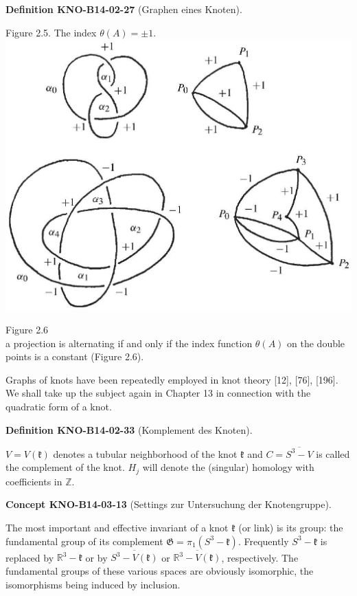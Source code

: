 \documentclass[10pt, letterpaper]{article}
\newcommand{\CustomHeading}[3]{%
  \par\medskip\noindent%
  \textbf{#1 #2} \textnormal{(#3)}.\enskip%
}
\newenvironment{DEF}[2]{\CustomHeading{Definition}{#1}{#2}}{}
\newenvironment{CONC}[2]{\CustomHeading{Concept}{#1}{#2}}{}
\begin{document}
\begin{DEF}{KNO-B14-02-27}{Graphen eines Knoten}
Figure 2.5. The index $\theta(A)= \pm 1$.\\
\includegraphics[scale=0.2, center]{2025_05_21_9c06be8de7a55410f8c1g-033}

Figure 2.6\\
a projection is alternating if and only if the index function $\theta(A)$ on the double points is a constant (Figure 2.6).

Graphs of knots have been repeatedly employed in knot theory [12], [76], [196]. We shall take up the subject again in Chapter 13 in connection with the quadratic form of a knot.
\end{DEF}

\begin{DEF}{KNO-B14-02-33}{Komplement des Knoten}
$V=V(\mathfrak{k})$ denotes a tubular neighborhood of the knot $\mathfrak{k}$ and $C=\overline{S^{3}-V}$ is called the complement of the knot. $H_{j}$ will denote the (singular) homology with coefficients in $\mathbb{Z}$.
\end{DEF}

\begin{CONC}{KNO-B14-03-13}{Settings zur Untersuchung der Knotengruppe}
The most important and effective invariant of a knot $\mathfrak{k}$ (or link) is its group: the fundamental group of its complement $\mathfrak{G}=\pi_{1}\left(S^{3}-\mathfrak{k}\right)$. Frequently $S^{3}-\mathfrak{k}$ is replaced by $\mathbb{R}^{3}-\mathfrak{k}$ or by $\overline{S^{3}-V(\mathfrak{k})}$ or $\overline{\mathbb{R}^{3}-V(\mathfrak{k})}$, respectively. The fundamental groups of these various spaces are obviously isomorphic, the isomorphisms being induced by inclusion.
\end{CONC}
\end{document}
